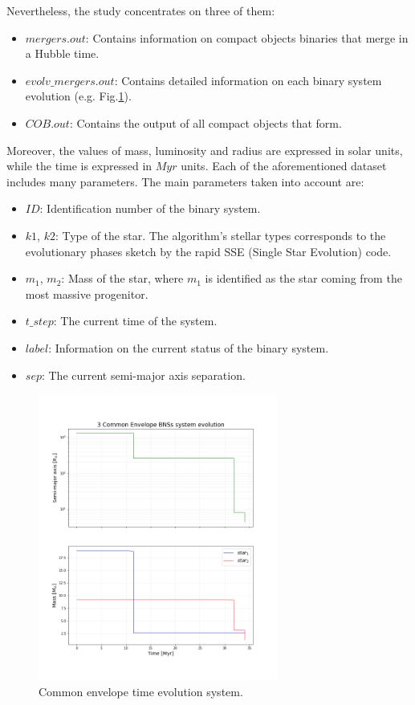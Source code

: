 \documentclass[preprint,12pt]{elsarticle}
\begin{document}
Nevertheless, the study concentrates on three of them:

\begin{itemize}
    \item $mergers.out$: Contains information on compact objects binaries that merge in a Hubble time.
    \item $evolv\_mergers.out$: Contains detailed information on each binary system evolution (e.g. Fig.\ref{img:3comenvtime}).
    \item $COB.out$: Contains the output of all compact objects that form.
\end{itemize}

Moreover, the values of mass, luminosity and radius are expressed in solar units, while the time is expressed in $Myr$ units. Each of the aforementioned dataset includes many parameters. The main parameters taken into account are:
\begin{itemize}
    \item $ID$: Identification number of the binary system.
    \item $k1$, $k2$: Type of the star. The algorithm's stellar types corresponds to the evolutionary phases sketch by the rapid SSE (Single Star Evolution) code\citep{Hurley:2002}.
    \item $m_1$, $m_2$: Mass of the star, where $m_1$ is identified as the star coming from the most massive progenitor. 
    \item $t\_step$: The current time of the system.
    \item $label$: Information on the current status of the binary system.
    \item $sep$: The current semi-major axis separation.
\end{itemize}
\begin{figure}[h!]
\centering
\includegraphics[width = 0.7\textwidth]{Images/3_COMENV_EVOLV.png}
\caption[Methods]{Common envelope time evolution system.}
\label{img:3comenvtime}
\end{figure}
\end{document}
